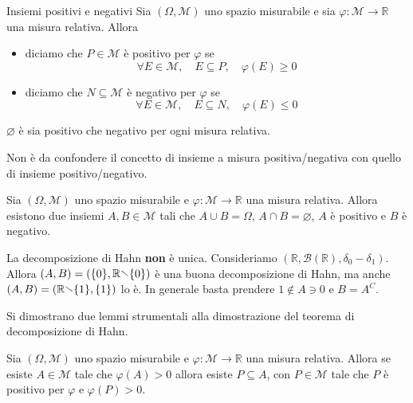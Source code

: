 \begin{definition}{Insiemi positivi e negativi}
    Sia \((\Omega, \mathcal{M})\) uno spazio misurabile e sia \(\varphi:
    \mathcal{M} \to  \mathbb{R}\) una misura relativa. Allora 
\begin{itemize}[label = --]
    \item diciamo che \(P \in \mathcal{M}\) è positivo per \(\varphi\) se 
        \[
            \forall E \in \mathcal{M}, \quad E \subseteq P, \quad \varphi(E) \ge
            0
        \]
    \item diciamo che \(N \subseteq \mathcal{M} \) è negativo per \(\varphi\) se 
        \[
            \forall E \in \mathcal{M}, \quad E \subseteq N, \quad \varphi(E) \le
            0
        \]
\end{itemize}
\end{definition}
\begin{remark}
    \(\varnothing\) è sia positivo che negativo per ogni misura relativa.
\end{remark}
\begin{remark}
    Non è da confondere il concetto di insieme a misura positiva/negativa
    con quello di insieme positivo/negativo.
\end{remark}
\begin{theorem}
    Sia \((\Omega, \mathcal{M})\) uno spazio misurabile e \(\varphi : \mathcal{M
    \to \mathbb{R}}\) una misura relativa. Allora esistono due insiemi \(A, B
    \in \mathcal{M}\) tali che \(A \cup B = \Omega\), \(A \cap B =
    \varnothing\), \(A\) è positivo e \(B\) è negativo.
\end{theorem}
\begin{remark}
    La decomposizione di Hahn \textbf{non} è unica. Consideriamo \((\mathbb{R},
    \mathcal{B}(\mathbb{R}), \delta_{0} - \delta_{1})\). Allora \((A,
    B) = (\{0\}, \mathbb{R} \sminus \{0\} )\) è una buona decomposizione di
    Hahn, ma anche \((A, B) = (\mathbb{R} \sminus \{1\}, \{1\} )\) lo è. In
    generale basta prendere \(1 \not\in A \ni 0\) e \(B = A^C\).
\end{remark}
Si dimostrano due lemmi strumentali alla dimostrazione del teorema di decomposizione di Hahn.
\begin{lemma}
    Sia \((\Omega, \mathcal{M})\) uno spazio misurabile e \(\varphi :
    \mathcal{M} \to \mathbb{R}\) una misura relativa. Allora se esiste \(A \in
    \mathcal{M}\) tale che \(\varphi(A) > 0\) allora esiste \(P \subseteq A \),
    con \(P \in \mathcal{M}\) tale che \(P\) è positivo per \(\varphi\) e
    \(\varphi(P)>0\).
\end{lemma}
